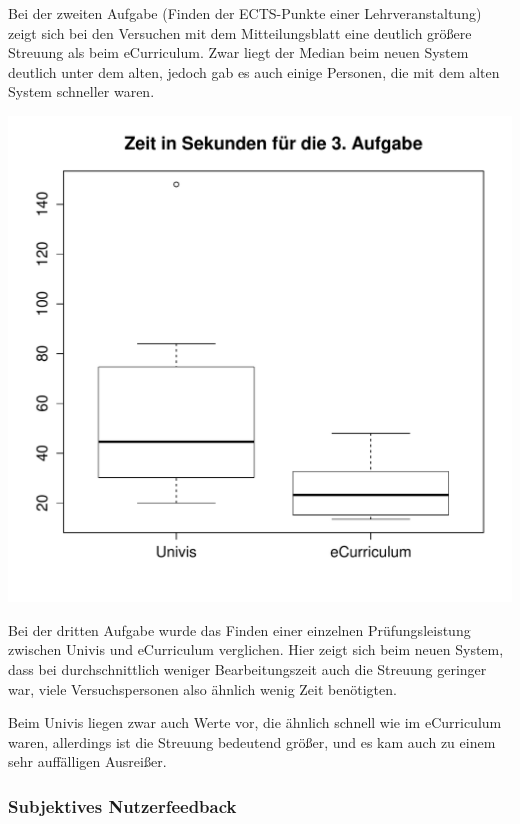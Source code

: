 \documentclass[a4paper,10pt]{scrartcl}
\begin{document}
Bei der zweiten Aufgabe (Finden der ECTS-Punkte einer Lehrveranstaltung) zeigt sich bei den Versuchen mit dem Mitteilungsblatt eine deutlich größere Streuung als beim eCurriculum. Zwar liegt der Median beim neuen System deutlich unter dem alten, jedoch gab es auch einige Personen, die mit dem alten System schneller waren.

\begin{center}
 \includegraphics[width=\linewidth]{./Appendix/Plots/Boxplots/a3_boxplot.pdf}
\end{center}

Bei der dritten Aufgabe wurde das Finden einer einzelnen Prüfungsleistung zwischen Univis und eCurriculum verglichen. Hier zeigt sich beim neuen System, dass bei durchschnittlich weniger Bearbeitungszeit auch die Streuung geringer war, viele Versuchspersonen also ähnlich wenig Zeit benötigten.

Beim Univis liegen zwar auch Werte vor, die ähnlich schnell wie im eCurriculum waren, allerdings ist die Streuung bedeutend größer, und es kam auch zu einem sehr auffälligen Ausreißer.

\pagebreak

\subsubsection*{Subjektives Nutzerfeedback} 
\end{document}
